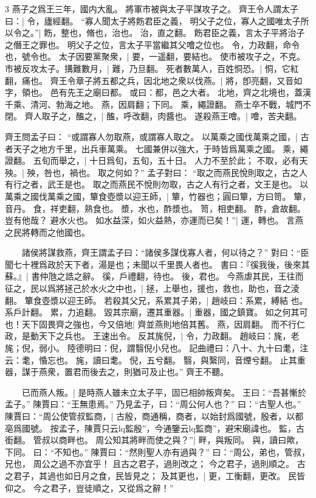 3 燕子之爲王三年，國内大亂。
  將軍市被與太子平謀攻子之。
  齊王令人謂太子曰：|{
	令，廬經翻。
}
“寡人聞太子將飭君臣之義，
明父子之位，寡人之國唯太子所以令之。”|{
	飭，整也，脩也，治也。
	治，直之翻。
	飭君臣之義，言太子平將治子之僭王之罪也。
	明父子之位，言太子平當繼其父噲之位也。
	令，力政翻，命令也，號令也。
}
太子因要黨聚衆，|{
	要，一遥翻，要結也。
}
使市被攻子之，不克。市被反攻太子。搆難數月，|{
	難，乃旦翻。
}
死者數萬人，百姓恫恐。|{
	恫，它紅翻，痛也。
}
齊王令章子將五都之兵，因北地之衆以伐燕。|{
	將，卽亮翻，又音如字，領也。
	邑有先王之廟曰都。
	或曰：都，邑之大者。
	北地，齊之北境也，蓋漢千乘、清河、勃海之地。
	燕，因肩翻；下同。
	乘，繩證翻。
}
燕士卒不戰，城門不閉。
	齊人取子之，醢之，|{
	醢，呼改翻，肉醬也。
}
遂殺燕王噲。|{
	噲，苦夬翻。
}

齊王問孟子曰：
“或謂寡人勿取燕，或謂寡人取之。
	以萬乘之國伐萬乘之國，|{
	古者天子之地方千里，出兵車萬乘。
	七國兼併以強大，于時皆爲萬乘之國。
	乘，繩證翻。
}
五旬而舉之，|{
	十日爲旬，五旬，五十日。
}
人力不至於此；
不取，必有天殃。|{
	殃，咎也，禍也。
}
取之何如？”
孟子對曰：
“取之而燕民悅則取之，古之人有行之者，武王是也。
	取之而燕民不悅則勿取，古之人有行之者，文王是也。
	以萬乘之國伐萬乘之國，簞食壺漿以迎王師，|{
	簞，竹器也；圓曰簞，方曰笥。
	簞，音丹。
	食，祥吏翻，熟食也。
	漿，水也，酢漿也。
	笥，相吏翻。
	酢，倉故翻。
}
豈有他哉？
避水火也。
如水益深，如火益熱，亦運而已矣！”|{
	運，轉也。
	言燕之民將轉而之他國也。
}

　　諸侯將謀救燕，齊王謂孟子曰：“諸侯多謀伐寡人者，何以待之？”
對曰：“臣聞七十裡爲政於天下者，湯是也；未聞以千里畏人者也。
	書曰：『徯我後，後來其蘇。』|{
	書仲虺之誥之辭。
	徯，戶禮翻，待也。
	後，君也。
}
今燕虐其民，王往而征之，民以爲將拯己於水火之中也，|{
	拯，上舉也，援也，救也，助也，音之淩翻。
}
簞食壺漿以迎王師。
	若殺其父兄，系累其子弟，|{
	趙岐曰：系累，縛結 也。
	系戶計翻。
	累，力追翻。
}
毀其宗廟，遷其重器。|{
	重器，國之鎮寶。
}
如之何其可也！天下固畏齊之強也，今又倍地|{
	齊並燕則地倍其舊。
	燕，因肩翻。
}
而不行仁政，是動天下之兵也。
	王速出令。
	反其旄倪，|{
	令，力政翻。
	趙岐曰：旄，老旄；倪，弱小。
	陸德明曰：倪，謂翳倪小兒也。
	記曲禮曰：八十、九十曰耄，注云：耄，惛忘也。
	旄，讀曰耄。
	倪，五兮翻。
	翳，與繄同，音煙兮翻。
}
止其重器，謀于燕衆，置君而後去之，則猶可及止也。”
齊王不聽。


　　已而燕人叛。|{
	是時燕人雖未立太子平，固已相帥叛齊矣。
}
王曰：“吾甚慚於孟子。”
陳賈曰：“王無患焉。”
乃見孟子，曰：“周公何人也？”
曰：“古聖人也。”
陳賈曰：“周公使管叔監商，|{
	古殷，商通稱，商者，以始封爲國號，殷者，以都亳爲國號。
	按孟子，陳賈只云lq監殷”，今通鑒云lq監商”，避宋廟諱也。
	監，古銜翻。
}
管叔以商畔也。
	周公知其將畔而使之與？”|{
	畔，與叛同。
	與，讀曰歟，下同。
}
曰：“不知也。”
陳賈曰：“然則聖人亦有過與？”
曰：“周公，弟也，管叔，兄也，
	周公之過不亦宜乎！
	且古之君子，過則改之；
	今之君子，過則順之。
	古之君子，其過也如日月之食，民皆見之；
	及其更也，|{
	更，工衡翻，更改。
}
	民皆仰之。
	今之君子，豈徒順之，又從爲之辭！”

